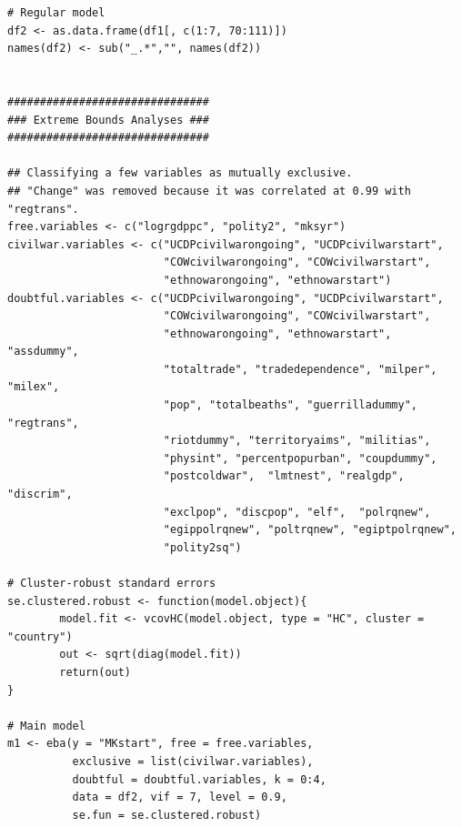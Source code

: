 \begin{verbatim}
# Regular model
df2 <- as.data.frame(df1[, c(1:7, 70:111)])
names(df2) <- sub("_.*","", names(df2)) 


###############################
### Extreme Bounds Analyses ###
###############################

## Classifying a few variables as mutually exclusive.
## "Change" was removed because it was correlated at 0.99 with "regtrans". 
free.variables <- c("logrgdppc", "polity2", "mksyr")
civilwar.variables <- c("UCDPcivilwarongoing", "UCDPcivilwarstart",
                        "COWcivilwarongoing", "COWcivilwarstart",
                        "ethnowarongoing", "ethnowarstart")
doubtful.variables <- c("UCDPcivilwarongoing", "UCDPcivilwarstart",
                        "COWcivilwarongoing", "COWcivilwarstart",
                        "ethnowarongoing", "ethnowarstart", "assdummy",
                        "totaltrade", "tradedependence", "milper", "milex",
                        "pop", "totalbeaths", "guerrilladummy", "regtrans",
                        "riotdummy", "territoryaims", "militias",
                        "physint", "percentpopurban", "coupdummy",
                        "postcoldwar",  "lmtnest", "realgdp", "discrim",
                        "exclpop", "discpop", "elf",  "polrqnew",
                        "egippolrqnew", "poltrqnew", "egiptpolrqnew",
                        "polity2sq")

# Cluster-robust standard errors
se.clustered.robust <- function(model.object){
        model.fit <- vcovHC(model.object, type = "HC", cluster = "country")
        out <- sqrt(diag(model.fit))
        return(out)
}

# Main model
m1 <- eba(y = "MKstart", free = free.variables,
          exclusive = list(civilwar.variables),
          doubtful = doubtful.variables, k = 0:4,
          data = df2, vif = 7, level = 0.9,
          se.fun = se.clustered.robust)


\end{verbatim}
